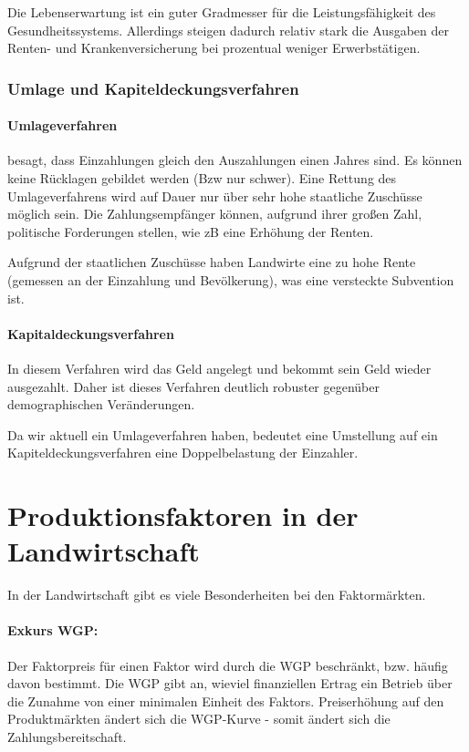 \documentclass[11pt]{scrbook}
\begin{document}
Die Lebenserwartung ist ein guter Gradmesser für die Leistungsfähigkeit des Gesundheitssystems.
Allerdings steigen dadurch relativ stark die Ausgaben der Renten- und Krankenversicherung bei prozentual weniger Erwerbstätigen.

\subsubsection{Umlage und Kapiteldeckungsverfahren}

\paragraph{Umlageverfahren} besagt, dass Einzahlungen gleich den Auszahlungen einen Jahres sind.
Es können keine Rücklagen gebildet werden (Bzw nur schwer).
Eine Rettung des Umlageverfahrens wird auf Dauer nur über sehr hohe staatliche Zuschüsse möglich sein.
Die Zahlungsempfänger können, aufgrund ihrer großen Zahl, politische Forderungen stellen, wie zB eine Erhöhung der Renten.

Aufgrund der staatlichen Zuschüsse haben Landwirte eine zu hohe Rente (gemessen an der Einzahlung und Bevölkerung), was eine versteckte Subvention ist.

\paragraph{Kapitaldeckungsverfahren}
In diesem Verfahren wird das Geld angelegt und bekommt sein \glqq Geld\grqq{} wieder ausgezahlt.
Daher ist dieses Verfahren deutlich robuster gegenüber demographischen Veränderungen.

Da wir aktuell ein Umlageverfahren haben, bedeutet eine Umstellung auf ein Kapiteldeckungsverfahren eine Doppelbelastung der Einzahler.

\section{Produktionsfaktoren in der Landwirtschaft}

In der Landwirtschaft gibt es viele Besonderheiten bei den Faktormärkten.

\paragraph{Exkurs \ac{WGP}:}
Der Faktorpreis für einen Faktor wird durch die \ac{WGP} beschränkt, bzw. häufig davon bestimmt.
Die \ac{WGP} gibt an, wieviel finanziellen Ertrag ein Betrieb über die Zunahme von einer minimalen Einheit des Faktors.
Preiserhöhung auf den Produktmärkten ändert sich die \ac{WGP}-Kurve - somit ändert sich die Zahlungsbereitschaft.
\end{document}
